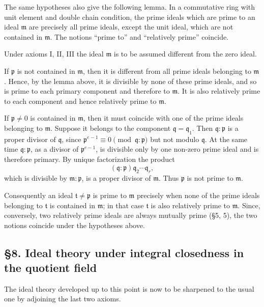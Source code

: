 \documentclass[11pt]{article}
\begin{document}
The same hypotheses also give the following lemma. In a commutative ring
with unit element and double chain condition, the prime ideals which are
prime to an ideal \(\mathfrak m\) are precisely all prime ideals, except
the unit ideal, which are not contained in \(\mathfrak m\). The notions
``prime to'' and ``relatively prime'' coincide.

Under axioms I, II, III the ideal \(\mathfrak m\) is to be assumed
different from the zero ideal.

If \(\mathfrak p\) is not contained in \(\mathfrak m\), then it is
different from all prime ideals belonging to \(\mathfrak m\). Hence, by
the lemma above, it is divisible by none of these prime ideals, and so
is prime to each primary component and therefore to \(\mathfrak m\). It
is also relatively prime to each component and hence relatively prime to
\(\mathfrak m\).

If \(\mathfrak p\ne0\) is contained in \(\mathfrak m\), then it must
coincide with one of the prime ideals belonging to \(\mathfrak m\).
Suppose it belongs to the component \(\mathfrak q=\mathfrak q_1\). Then
\(\mathfrak q:\mathfrak p\) is a proper divisor of \(\mathfrak q\),
since \(\mathfrak p^{e-1}\equiv0\pmod{\mathfrak q:\mathfrak p}\) but not
modulo \(\mathfrak q\). At the same time \(\mathfrak q:\mathfrak p\), as
a divisor of \(\mathfrak p^{e-1}\), is divisible only by one non-zero
prime ideal and is therefore primary. By unique factorization the
product \[
  (\mathfrak q:\mathfrak p)\mathfrak q_2\cdots\mathfrak q_r,
\] which is divisible by \(\mathfrak m:\mathfrak p\), is a proper
divisor of \(\mathfrak m\). Thus \(\mathfrak p\) is not prime to
\(\mathfrak m\).

Consequently an ideal \(\mathfrak t\ne\mathfrak p\) is prime to
\(\mathfrak m\) precisely when none of the prime ideals belonging to
\(\mathfrak t\) is contained in \(\mathfrak m\); in that case
\(\mathfrak t\) is also relatively prime to \(\mathfrak m\). Since,
conversely, two relatively prime ideals are always mutually prime (§5,
5), the two notions coincide under the hypotheses above.

\subsection{§8. Ideal theory under integral closedness in the quotient
field}\label{ideal-theory-under-integral-closedness-in-the-quotient-field}

The ideal theory developed up to this point is now to be sharpened to
the usual one by adjoining the last two axioms.
\end{document}
